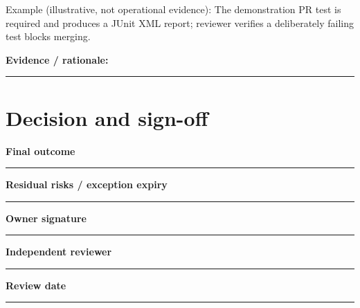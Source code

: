 \documentclass[11pt,letterpaper]{article}
\begin{document}
Example (illustrative, not operational evidence): The demonstration PR test is required and produces a JUnit XML report; reviewer verifies a deliberately failing test blocks merging.

\noindent\textbf{Evidence / rationale:}\par\nobreak\vspace{8pt}\noindent\rule{0.93\linewidth}{0.4pt}\par\vspace{14pt}
\section{Decision and sign-off}
\noindent\textbf{Final outcome}\par\nobreak\vspace{6pt}\noindent\rule{0.93\linewidth}{0.4pt}\par\vspace{14pt}
\noindent\textbf{Residual risks / exception expiry}\par\nobreak\vspace{6pt}\noindent\rule{0.93\linewidth}{0.4pt}\par\vspace{14pt}
\noindent\textbf{Owner signature}\par\nobreak\vspace{6pt}\noindent\rule{0.93\linewidth}{0.4pt}\par\vspace{14pt}
\noindent\textbf{Independent reviewer}\par\nobreak\vspace{6pt}\noindent\rule{0.93\linewidth}{0.4pt}\par\vspace{14pt}
\noindent\textbf{Review date}\par\nobreak\vspace{6pt}\noindent\rule{0.93\linewidth}{0.4pt}\par\vspace{14pt}
\end{document}
